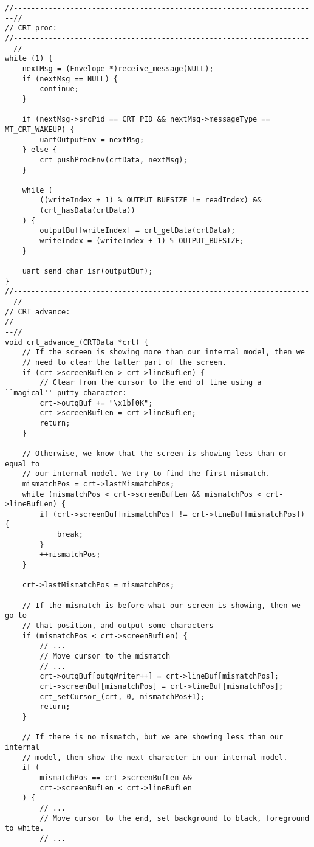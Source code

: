 \documentclass[12pt]{report}
\begin{document}
\label{code:uart_output}
\begin{lstlisting}
//----------------------------------------------------------------------//
// CRT_proc:
//----------------------------------------------------------------------//
while (1) {
    nextMsg = (Envelope *)receive_message(NULL);
    if (nextMsg == NULL) {
        continue;
    }

    if (nextMsg->srcPid == CRT_PID && nextMsg->messageType == MT_CRT_WAKEUP) {
        uartOutputEnv = nextMsg;
    } else {
        crt_pushProcEnv(crtData, nextMsg);
    }

    while (
        ((writeIndex + 1) % OUTPUT_BUFSIZE != readIndex) &&
        (crt_hasData(crtData))
    ) {
        outputBuf[writeIndex] = crt_getData(crtData);
        writeIndex = (writeIndex + 1) % OUTPUT_BUFSIZE;
    }

    uart_send_char_isr(outputBuf);
}
//----------------------------------------------------------------------//
// CRT_advance:
//----------------------------------------------------------------------//
void crt_advance_(CRTData *crt) {
    // If the screen is showing more than our internal model, then we
    // need to clear the latter part of the screen.
    if (crt->screenBufLen > crt->lineBufLen) {
        // Clear from the cursor to the end of line using a ``magical'' putty character:
        crt->outqBuf += "\x1b[0K";
        crt->screenBufLen = crt->lineBufLen;
        return;
    }

    // Otherwise, we know that the screen is showing less than or equal to
    // our internal model. We try to find the first mismatch.
    mismatchPos = crt->lastMismatchPos;
    while (mismatchPos < crt->screenBufLen && mismatchPos < crt->lineBufLen) {
        if (crt->screenBuf[mismatchPos] != crt->lineBuf[mismatchPos]) {
            break;
        }
        ++mismatchPos;
    }

    crt->lastMismatchPos = mismatchPos;

    // If the mismatch is before what our screen is showing, then we go to
    // that position, and output some characters
    if (mismatchPos < crt->screenBufLen) {
        // ...
        // Move cursor to the mismatch
        // ...
        crt->outqBuf[outqWriter++] = crt->lineBuf[mismatchPos];
        crt->screenBuf[mismatchPos] = crt->lineBuf[mismatchPos];
        crt_setCursor_(crt, 0, mismatchPos+1);
        return;
    }

    // If there is no mismatch, but we are showing less than our internal
    // model, then show the next character in our internal model.
    if (
        mismatchPos == crt->screenBufLen &&
        crt->screenBufLen < crt->lineBufLen
    ) {
        // ...
        // Move cursor to the end, set background to black, foreground to white.
        // ...


\end{lstlisting}
\end{document}
